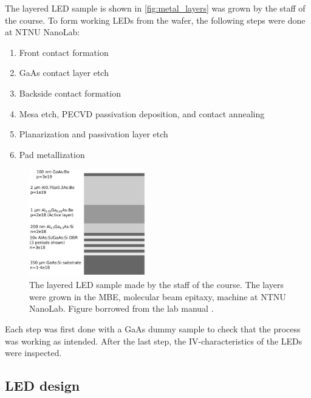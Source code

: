 
\noindent The layered LED sample is shown in \autoref{fig:metal_layers} was grown by the staff of the course.
To form working LEDs from the wafer, the following steps were done at NTNU NanoLab:

\begin{enumerate}
    \item Front contact formation
    \item GaAs contact layer etch
    \item Backside contact formation
    \item Mesa etch, PECVD passivation deposition, and contact annealing
    \item Planarization and passivation layer etch
    \item Pad metallization
\end{enumerate}

\begin{figure}[ht]
    \centering
    \includegraphics[width=0.45\textwidth]{figures/metal_layers.jpg}
    \caption{
        The layered LED sample made by the staff of the course.
        The layers were grown in the MBE, molecular beam epitaxy, machine at NTNU NanoLab.
        Figure borrowed from the lab manual \cite{labmanual}.
    }
    \label{fig:metal_layers}

\end{figure}

Each step was first done with a GaAs dummy sample to check that the process was working as intended.
After the last step, the IV-characteristics of the LEDs were inspected.


\subsection{LED design}
\label{methods:led_design}

